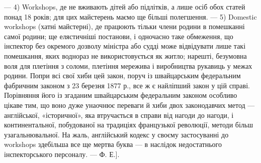 — 4) Workshops, де не вживають дітей або підлітків, а лише осіб
обох статей понад 18 років; для цих майстерень маємо ще більші полегшення.
— 5) Domestic workshops (хатні майстерні), де працюють тільки
члени родини в помешканні самої родини; ще елястичніші постанови,
і одночасно таке обмеження, що інспектор без окремого дозволу міністра
або судді може відвідувати лише такі помешкання, яких воднораз не
використовується як житло; нарешті, безумовна воля для плетіння з
соломи, плетіння мережива і виробництва рукавиць у межах родини.
Попри всі свої хиби цей закон, поруч із швайцарським федеральним
фабричним законом з 23 березня 1877 р., все ж є найліпший закон у цій
справі. Порівняння його із згаданим швайцарським федеральним законом
особливо цікаве тим, що воно дуже унаочнює переваги й хиби двох законодавчих
метод — англійської, «історичної», яка втручається в справи
від нагоди до нагоди, і континентальної, побудованої на традиціях французької
революції, методи більш узагальнювальної. На жаль, англійський
кодекс у своєму застосуванні до workshops здебільша все ще мертва
буква — в наслідок недостатнього інспекторського персоналу. — Ф. Е.].

